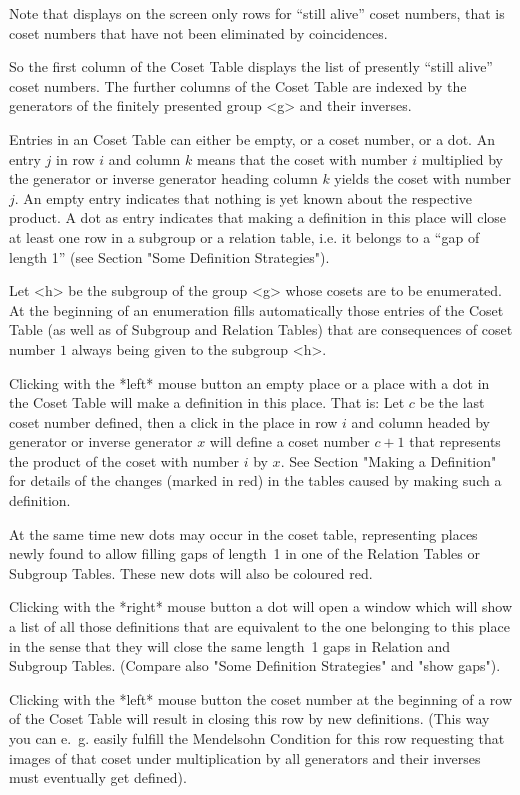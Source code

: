 Note that {\ITC} displays on the screen only rows for ``still alive''
coset numbers, that is coset numbers that have not been eliminated by
coincidences.

So the first column of the {\ITC} Coset Table displays the list of
presently ``still alive'' coset numbers. The further columns of the
{\ITC} Coset Table are indexed by the generators of the finitely
presented group <g> and their inverses.

Entries in an {\ITC} Coset Table can either be empty, or a coset
number, or a dot. An entry $j$ in row $i$ and column $k$ means that
the coset with number $i$ multiplied by the generator or inverse
generator heading column $k$ yields the coset with number $j$. An
empty entry indicates that nothing is yet known about the respective
product. A dot as entry indicates that making a definition in this
place will close at least one row in a subgroup or a relation table,
i.e. it belongs to a ``gap of length 1'' (see Section "Some
Definition Strategies").

Let <h> be the subgroup of the group <g> whose cosets are to be
enumerated. At the beginning of an enumeration {\ITC} fills
automatically those entries of the Coset Table (as well as of Subgroup
and Relation Tables) that are consequences of coset number $1$ always
being given to the subgroup <h>.

Clicking with the *left* mouse button an empty place or a place
with a dot in the Coset Table will make a definition in this place.
That is: Let $c$ be the last coset number defined, then a click in the
place in row $i$ and column headed by generator or inverse generator
$x$ will define a coset number $c+1$ that represents the product of
the coset with number $i$ by $x$. See Section "Making a Definition"
for details of the changes (marked in red) in the tables caused by
making such a definition.

At the same time new dots may occur in the coset table, representing
places newly found to allow filling gaps of length~1 in one of the
Relation Tables or Subgroup Tables. These new dots will also be
coloured red.

Clicking with the *right* mouse button a dot will open a window
which will show a list of all those definitions that are equivalent to
the one belonging to this place in the sense that they will close the
same length~1 gaps in Relation and Subgroup Tables. (Compare also
"Some Definition Strategies" and "show gaps").

Clicking with the *left* mouse button the coset number at the
beginning of a row of the Coset Table will result in closing this row
by new definitions. (This way you can e.~g. easily fulfill the
Mendelsohn Condition for this row requesting that images of that coset
under multiplication by all generators and their inverses must
eventually get defined).

